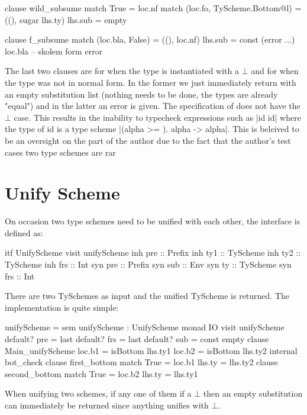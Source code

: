 \begin{code}
clause wild_subsume
  match True                        = loc.nf
  match (loc.fo, TyScheme.Bottom@l) = ((), sugar lhs.ty)
  lhs.sub = empty
  
clause f_subsume
  match (loc.bla, False) = ((), loc.nf)
  lhs.sub = const (error ...) loc.bla -- skolem form error
\end{code}
The last two clauses are for when the type is instantiated with a $\bot$ and for when the type was not in normal form. In the former we just immediately return with an empty substitution list (nothing needs to be done, the types are already "equal") and in the latter an error is given. The specification of \cite{HML} does not have the $\bot$ case. This results in the inability to typecheck expressions such as |id id| where the type of id is a type scheme |(alpha >= \bot). alpha -> alpha|. This is beleived to be an oversight on the part of the author due to the fact that the author's test cases two type schemes are rar

\section{Unify Scheme} 
On occasion two type schemes need to be unified with each other, the interface is defined as:

\begin{code}
itf UnifyScheme
  visit unifyScheme
    inh pre  :: Prefix
    inh ty1  :: TyScheme
    inh ty2  :: TyScheme
    inh frs  :: Int
    syn pre  :: Prefix
    syn sub  :: Env
    syn ty   :: TyScheme
    syn frs  :: Int 
\end{code}

There are two TySchemes as input and the unified TyScheme is returned. The implementation is quite simple:

\begin{code}
unifyScheme = sem unifyScheme : UnifyScheme monad IO
                visit unifyScheme
                  default? pre = last
                  default? frs = last
                  default? sub = const empty
                  clause Main_unifyScheme
                      loc.b1  = isBottom lhs.ty1
                      loc.b2  = isBottom lhs.ty2
                      internal bot_check
                        clause first_bottom
                            match True  = loc.b1
                            lhs.ty      = lhs.ty2
                        clause second_bottom
                            match True  = loc.b2
                            lhs.ty      = lhs.ty1
\end{code}
When unifying two schemes, if any one of them if a $\bot$ then an empty substitution can immediately be returned since anything unifies with $\bot$. 

